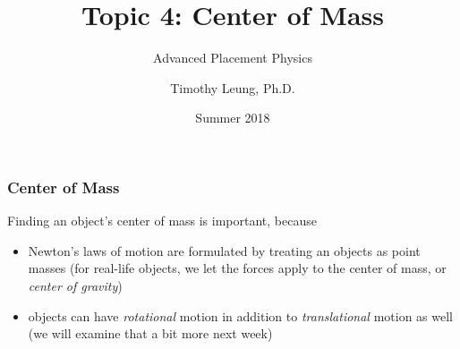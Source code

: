 \documentclass[12pt,compress,aspectratio=169]{beamer}
\title{Topic 4: Center of Mass}
\subtitle{Advanced Placement Physics}
\author[TML]{Timothy Leung, Ph.D.}
\institute{Olympiads School}
\date{Summer 2018}
\begin{document}
\begin{frame}
  \maketitle
\end{frame}

%


\begin{frame}
  \frametitle{Center of Mass}
  Finding an object's center of mass
  is important, because
  \begin{itemize}
  \item Newton's laws of motion are formulated by treating an objects as point
    masses (for real-life objects, we let the forces apply to the center of
    mass, or \emph{center of gravity})
  \item objects can have \emph{rotational} motion in addition to
    \emph{translational} motion as well (we will examine that a bit more
    next week)
  \end{itemize}
\end{frame}
\end{document}
